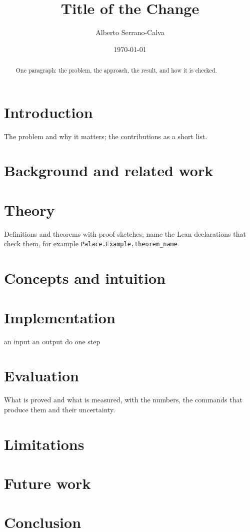 \documentclass[11pt]{article}
\title{Title of the Change}
\author{Alberto Serrano-Calva}
\date{\today}
\theoremstyle{plain}
\theoremstyle{definition}
\theoremstyle{remark}
\newcommand{\lean}[1]{\texttt{#1}}
\begin{document}
\maketitle

\begin{abstract}
One paragraph: the problem, the approach, the result, and how it is checked.
\end{abstract}

\section{Introduction}
The problem and why it matters; the contributions as a short list.

\section{Background and related work}

\section{Theory}
Definitions and theorems with proof sketches; name the Lean declarations that check them, for
example \lean{Palace.Example.theorem\_name}.

\section{Concepts and intuition}

\section{Implementation}
\begin{algorithm}
\caption{A procedure, in pseudocode.}
\begin{algorithmic}[1]
\Require an input
\Ensure an output
\State do one step
\end{algorithmic}
\end{algorithm}

\section{Evaluation}
What is proved and what is measured, with the numbers, the commands that produce them and their
uncertainty.

\section{Limitations}

\section{Future work}

\section{Conclusion}



\end{document}
